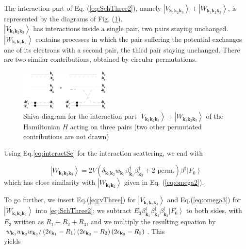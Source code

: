\documentclass[epj]{svjour}
\begin{document}
The interaction part of Eq. (\ref{eq:SchThree2}), namely $\left|V_{\mathbf{k} _1\mathbf{k} _2%
\mathbf{k} _3}\right>+\left|W_{\mathbf{k} _1\mathbf{k} _2\mathbf{k} _3}\right> $, is represented by the diagrams of Fig. (\ref{fig:threeP}). \\$\left|V_{\mathbf{k} _1\mathbf{k} _2
\mathbf{k} _3}\right>$ has interactions inside a single pair, two pairs
staying unchanged. $\left|W_{\mathbf{k} _1\mathbf{k} _2\mathbf{k} _3}\right> $ contains processes in which the pair suffering the potential exchanges one of its electrons with a second pair, the third pair staying unchanged.  There  are two similar  contributions, obtained by circular permutations.
\begin{figure}[htb]
   \includegraphics[width=0.4\textwidth]{threePair.eps}
\caption{Shiva diagram for the interaction part $\left|V_{\mathbf{k} _1\mathbf{k} _2
\mathbf{k} _3}\right> +\left|W_{\mathbf{k} _1\mathbf{k} _2
\mathbf{k} _3}\right>$ of the Hamiltonian $H$ acting on three pairs (two other permutated contributions are not drawn) }\label{fig:threeP}
 \end{figure}

Using Eq.\eqref{eq:interactSc} for the interaction scattering, we end with

\begin{equation}\label{eq:omega3}
\left|W_{\mathbf{k} _1\mathbf{k} _2\mathbf{k} _3}\right>= 2V(\delta_{\mathbf{k} _1\mathbf{k} _2}w_{\mathbf{k} _1}\beta^{\dagger}_{\mathbf{k} _1}\beta^{\dagger}_{\mathbf{k} _3}+ \text{2 perm.})\beta^{\dagger}\left|F_0\right>
\end{equation}
which has close similarity with  $\left|W_{\mathbf{k} _1\mathbf{k} _2}\right> $ given in Eq. (\ref{eq:omega2}). 



To go further, we insert Eq.(\ref{eq:vThree}) for $\left|V_{\mathbf{k} _1\mathbf{k} _2\mathbf{k} _3}\right>$  and Eq.(\ref{eq:omega3}) for $\left|W_{\mathbf{k} _1\mathbf{k} _2\mathbf{k} _3}\right> $ into \eqref{eq:SchThree2}; we subtract $E
_3\beta^{\dagger}_{\mathbf{k} _1}\beta^{\dagger}_{\mathbf{k}
_2}\beta^{\dagger}_{\mathbf{k} _3}\left|F_0\right>  $ to both sides, with $%
E _3$ written as $R_1+R_2+R_3$, and we multiply the resulting equation
by \\$w_{\mathbf{k} _1}w_{\mathbf{k} _2}w_{\mathbf{k} _3}/\left(2\epsilon_{%
\mathbf{k} _1}-R_1\right) \left(2\epsilon_{\mathbf{k} _2}-R_2\right)
\left(2\epsilon_{\mathbf{k} _3}-R_3\right) $. This \\yields
\end{document}

